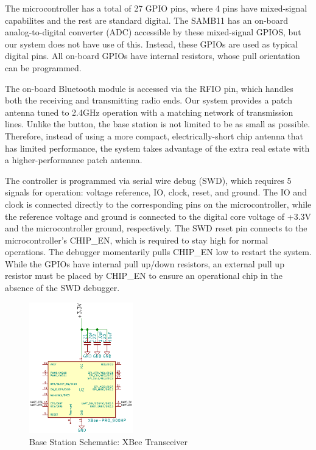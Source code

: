 \documentclass[journal,compsoc]{IEEEtran}
\begin{document}
The microcontroller has a total of 27 GPIO pins, where 4 pins have mixed-signal capabilites and the rest are standard digital. The SAMB11 has an on-board analog-to-digital converter (ADC) accessible by these mixed-signal GPIOS, but our system does not have use of this. Instead, these GPIOs are used as typical digital pins. All on-board GPIOs have internal resistors, whose pull orientation can be programmed.

The on-board Bluetooth module is accessed via the RFIO pin, which handles both the receiving and transmitting radio ends. Our system provides a patch antenna tuned to 2.4GHz operation with a matching network of transmission lines. Unlike the button, the base station is not limited to be as small as possible. Therefore, instead of using a more compact, electrically-short chip antenna that has limited performance, the system takes advantage of the extra real estate with a higher-performance patch antenna.

The controller is programmed via serial wire debug (SWD), which requires 5 signals for operation: voltage reference, IO, clock, reset, and ground. The IO and clock is connected directly to the corresponding pins on the microcontroller, while the reference voltage and ground is connected to the digital core voltage of +3.3V and the microcontroller ground, respectively. The SWD reset pin connects to the microcontroller's CHIP\_EN, which is required to stay high for normal operations. The debugger momentarily pulls CHIP\_EN low to restart the system. While the GPIOs have internal pull up/down resistors, an external pull up resistor must be placed by CHIP\_EN to ensure an operational chip in the absence of the SWD debugger.

\begin{figure}[ht] 	%
\centering
\includegraphics[width=0.4\textwidth]{base-schematic-xbee.png}
\caption{ \space Base Station Schematic: XBee Transceiver}
\label{base-sch-xbee}
\end{figure}
\end{document}

